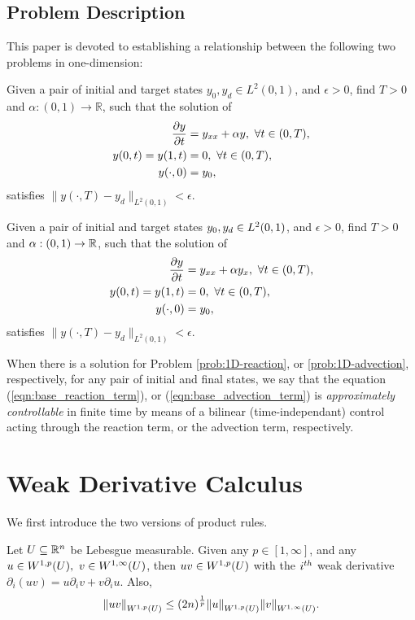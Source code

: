 \documentclass{ifacconf}
\begin{document}
\subsection{Problem Description}
This paper is devoted to establishing a relationship between the following two problems in one-dimension:
\begin{prob}
\label{prob:1D-reaction}
  Given a pair of initial and target states \(y_0, y_d \in L^2(0,1)\), and \(\epsilon>0\),
  find \(T>0\) and \(\alpha:(0,1)\to\mathbb{R}\), such that the solution of
  \begin{equation}
  \label{sys:base_reaction_term}
    \begin{split}
      \frac{\partial y}{\partial t} &= y_{xx}+\alpha y, ~\forall t\in(0,T),\\
      y(0,t)=y(1,t)&=0, ~\forall t\in(0,T),\\
      y(\cdot,0)&=y_0,
    \end{split}
  \end{equation}
  satisfies \(\|y(\cdot,T)-y_d\|_{L^2(0,1)}<\epsilon\).
\end{prob}

\begin{prob}
\label{prob:1D-advection}
    Given a pair of initial and target states $y_0, y_d \in {L^{2}_{}{\left ( 0,1 \right )}}$, and $\epsilon > 0$, find $T > 0$ and $\alpha: (0,1) \to {\mathbb{R}}$, such that the solution of
    \begin{equation}
  \label{sys:base_advection_term}
        \begin{split}
            \frac{\partial y}{\partial t} &= y_{xx}+\alpha y_x, ~\forall t \in (0,T),\\
            y(0,t)=y(1,t)&=0, ~\forall t \in (0,T),\\
            y(\cdot, 0) &= y_0,   
        \end{split}
    \end{equation} 
    satisfies \(\|y(\cdot,T)-y_d\|_{L^2(0,1)}<\epsilon\).
\end{prob}
When there is a solution for Problem \ref{prob:1D-reaction}, or \ref{prob:1D-advection}, respectively, for any pair of initial and final states, we say that the equation (\ref{eqn:base_reaction_term}), or (\ref{eqn:base_advection_term}) is \textit{approximately controllable} in finite time by means of a bilinear (time-independant) control acting through the reaction term, or the advection term, respectively.

\section{Weak Derivative Calculus}
We first introduce the two versions of product rules.
\begin{prop}
\label{Product Rule}
\cite[Corollary 4.1.18]{weber_introduction_2018}
    Let $U \subseteq {\mathbb{R}}^n$ be Lebesgue measurable. Given any $p \in [1,\infty]$, and any $u \in {W^{1,p}_{}{\left ( U \right )}}, ~ v \in {W^{1,\infty}_{}{\left ( U \right )}}$, then $uv \in {W^{1, p}_{}{\left ( U \right )}}$ with the $i^{th}$ weak derivative $\partial_i(uv) = u\partial_iv + v\partial_iu$. Also, $${\left\| uv\right\|}_{W^{1,p}_{}{\left ( U \right )}} \leq (2n)^\frac{1}{p}{\left\| u\right\|}_{W^{1,p}_{}{\left ( U \right )}}{\left\| v\right\|}_{W^{1, \infty}_{}{\left ( U \right )}}.$$
\end{prop}
\end{document}
